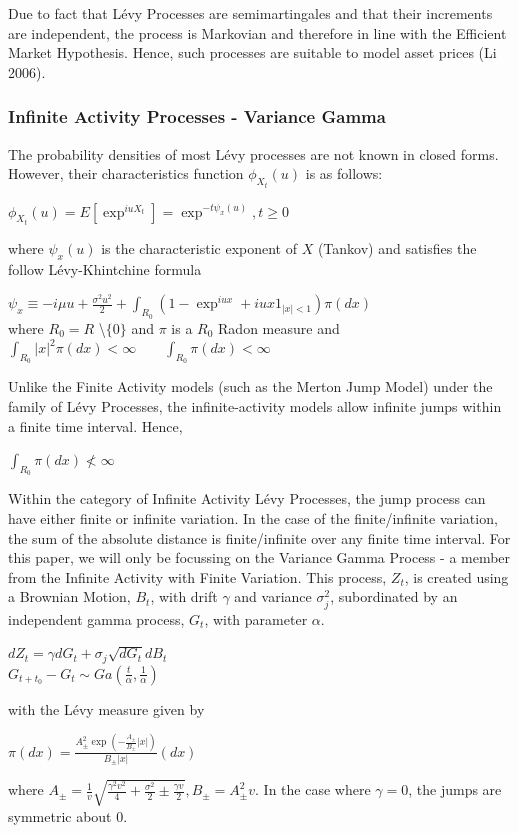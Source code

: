\documentclass[12pt]{article}
\theoremstyle{definition}
\begin{document}
\justify Due to fact that L\'{e}vy Processes are semimartingales and that their increments are independent, the process is Markovian and therefore in line with the Efficient Market Hypothesis. Hence, such processes are suitable to model asset prices (Li 2006). 
\subsubsection{Infinite Activity Processes - Variance Gamma}
The probability densities of most L\'{e}vy processes are not known in closed forms. However, their characteristics function $\phi_{X_{t}}(u)$ is as follows:
\begin{center}
$
\phi_{X_{t}}(u) = E[\exp^{iuX_{t}}] = \exp^{-t\psi_{x}(u)},t\ge 0
$
\end{center}


\justify where $\psi_{x}(u)$ is the characteristic exponent of $X$ (Tankov) and satisfies the follow L\'{e}vy-Khintchine formula
\begin{center}
$\psi_{x}\equiv -i\mu u + \frac{\sigma^{2}u^{2}}{2} + \int_{R_{0}} (1-\exp^{iux}+iux1_{|x|<1})\pi (dx) $\\
where $R_{0} = R$ \textbackslash $\{0\}$ and $\pi$ is a $R_{0}$ Radon measure and \\
$\int_{R_{0}} |x|^{2} \pi (dx)< \infty \qquad \int_{R_{0}} \pi (dx) < \infty$
\end{center}

Unlike the Finite Activity models (such as the Merton Jump Model) under the family of L\'{e}vy Processes, the infinite-activity models allow infinite jumps within a finite time interval. Hence,
\begin{center}
$\int_{R_{0}} \pi (dx) \not< \infty$
\end{center}

Within the category of Infinite Activity L\'{e}vy Processes, the jump process can have either finite or infinite variation. In the case of the finite/infinite variation, the sum of the absolute distance is finite/infinite over any finite time interval. For this paper, we will only be focussing on the Variance Gamma Process - a member from the Infinite Activity with Finite Variation. This process, $Z_{t}$, is created using a Brownian Motion, $B_{t}$, with drift $\gamma$ and variance $\sigma_{j}^2$, subordinated by an independent gamma process, $G_{t}$, with parameter $\alpha$.
\begin{center}
$dZ_{t} = \gamma dG_{t} + \sigma_{j}\sqrt{dG_{t}}dB_{t}$\\
$G_{t+t_{0}} - G_{t} \sim Ga(\frac{t}{\alpha},\frac{1}{\alpha})$
\end{center}
with the L\'{e}vy measure given by
\begin{center}
$\pi(dx) = \frac{A^{2}_{\pm}\exp(-\frac{A_{\pm}}{B_{\pm}}|x|)}{B_{\pm}|x|}(dx)$
\end{center}
where $A_{\pm}=\frac{1}{v}\sqrt{\frac{\gamma^{2}v^{2}}{4}+\frac{\sigma^{2}}{2} \pm \frac{\gamma v}{2}},B_{\pm}=A^{2}_{\pm}v$. In the case where $\gamma=0$, the jumps are symmetric about 0.
\end{document}
